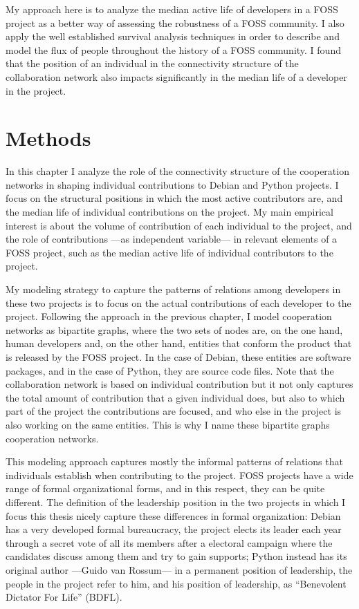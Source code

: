 My approach here is to analyze the median active life of developers in a FOSS project as a better way of assessing the robustness of a FOSS community. I also apply the well established survival analysis techniques \citep{miller:2011} in order to describe and model the flux of people throughout the history of a FOSS community.  I found that the position of an individual in the connectivity structure of the collaboration network also impacts significantly in the median life of a developer in the project.

\section{Methods}

In this chapter I analyze the role of the connectivity structure of the cooperation networks in shaping individual contributions to Debian and Python projects. I focus on the structural positions in which the most active contributors are, and the median life of individual contributions on the project. My main empirical interest is about the volume of contribution of each individual to the project, and the role of contributions ---as independent variable--- in relevant elements of a FOSS project, such as the median active life of individual contributors to the project.

My modeling strategy to capture the patterns of relations among developers in these two projects is to focus on the actual contributions of each developer to the project. Following the approach in the previous chapter, I model cooperation networks as bipartite graphs, where the two sets of nodes are, on the one hand, human developers and, on the other hand, entities that conform the product that is released by the FOSS project. In the case of Debian, these entities are software packages, and in the case of Python, they are source code files. Note that the collaboration network is based on individual contribution but it not only captures the total amount of contribution that a given individual does, but also to which part of the project the contributions are focused, and who else in the project is also working on the same entities. This is why I name these bipartite graphs cooperation networks.

This modeling approach captures mostly the informal patterns of relations that individuals establish when contributing to the project. FOSS projects have a wide range of formal organizational forms, and in this respect, they can be quite different. The definition of the leadership position in the two projects in which I focus this thesis nicely capture these differences in formal organization: Debian has a very developed formal bureaucracy, the project elects its leader each year through a secret vote of all its members after a electoral campaign where the candidates discuss among them and try to gain supports; Python instead has its original author ---Guido van Rossum--- in a permanent position of leadership, the people in the project refer to him, and his position of leadership, as ``Benevolent Dictator For Life'' (BDFL).

